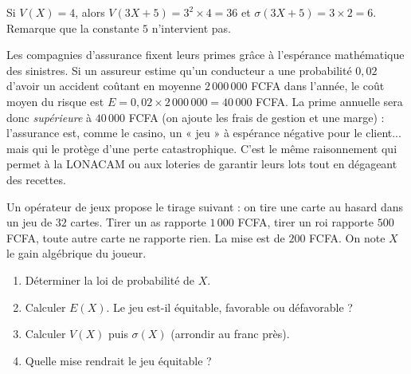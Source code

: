 \documentclass[11pt]{article}
\begin{document}
\begin{exemplebox}
Si $V(X) = 4$, alors $V(3X + 5) = 3^2 \times 4 = 36$ et $\sigma(3X+5) = 3 \times 2 = 6$. Remarque que la constante $5$ n'intervient pas.
\end{exemplebox}

\begin{savaistu}
Les compagnies d'assurance fixent leurs primes grâce à l'espérance mathématique des sinistres. Si un assureur estime qu'un conducteur a une probabilité $0{,}02$ d'avoir un accident coûtant en moyenne $2\,000\,000$ FCFA dans l'année, le coût moyen du risque est $E = 0{,}02 \times 2\,000\,000 = 40\,000$ FCFA. La prime annuelle sera donc \emph{supérieure} à $40\,000$ FCFA (on ajoute les frais de gestion et une marge) : l'assurance est, comme le casino, un « jeu » à espérance négative pour le client... mais qui le protège d'une perte catastrophique. C'est le même raisonnement qui permet à la LONACAM ou aux loteries de garantir leurs lots tout en dégageant des recettes.
\end{savaistu}

\begin{exercice}
Un opérateur de jeux propose le tirage suivant : on tire une carte au hasard dans un jeu de $32$ cartes. Tirer un as rapporte $1\,000$ FCFA, tirer un roi rapporte $500$ FCFA, toute autre carte ne rapporte rien. La mise est de $200$ FCFA. On note $X$ le gain algébrique du joueur.
\begin{enumerate}
\item Déterminer la loi de probabilité de $X$.
\item Calculer $E(X)$. Le jeu est-il équitable, favorable ou défavorable ?
\item Calculer $V(X)$ puis $\sigma(X)$ (arrondir au franc près).
\item Quelle mise rendrait le jeu équitable ?
\end{enumerate}
\end{exercice}
\end{document}
